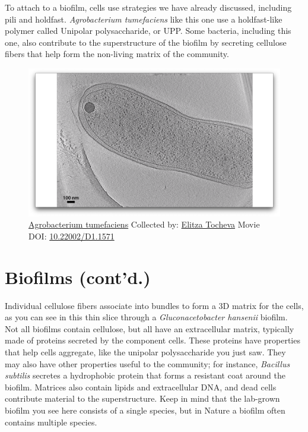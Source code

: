 \documentclass[]{tufte-book}
\begin{document}
To attach to a biofilm, cells use strategies we have already discussed,
including pili and holdfast. \emph{Agrobacterium tumefaciens} like this
one use a holdfast-like polymer called Unipolar polysaccharide, or UPP.
Some bacteria, including this one, also contribute to the superstructure
of the biofilm by secreting cellulose fibers that help form the
non-living matrix of the community.





\begin{figure}
\includegraphics{movie_stills/9_1} \caption[\protect\hyperlink{tree}{Agrobacterium tumefaciens} Collected
by: \protect\hyperlink{elitza_tocheva}{Elitza Tocheva} Movie DOI:
\href{https://doi.org/10.22002/D1.1571}{10.22002/D1.1571}]{\protect\hyperlink{tree}{Agrobacterium tumefaciens} Collected
by: \protect\hyperlink{elitza_tocheva}{Elitza Tocheva} Movie DOI:
\href{https://doi.org/10.22002/D1.1571}{10.22002/D1.1571}}\label{fig:9-1}
\end{figure}

\section{Biofilms (cont'd.)}\label{biofilms-contd.}

Individual cellulose fibers associate into bundles to form a 3D matrix
for the cells, as you can see in this thin slice through a
\emph{Gluconacetobacter hansenii} biofilm. Not all biofilms contain
cellulose, but all have an extracellular matrix, typically made of
proteins secreted by the component cells. These proteins have properties
that help cells aggregate, like the unipolar polysaccharide you just
saw. They may also have other properties useful to the community; for
instance, \emph{Bacillus subtilis} secretes a hydrophobic protein that
forms a resistant coat around the biofilm. Matrices also contain lipids
and extracellular DNA, and dead cells contribute material to the
superstructure. Keep in mind that the lab-grown biofilm you see here
consists of a single species, but in Nature a biofilm often contains
multiple species.
\end{document}
